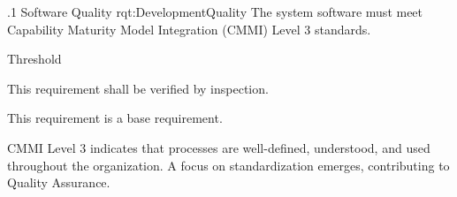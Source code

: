 \ONERQMT
{\RqtNumberBase.1}
{Software Quality}
{rqt:DevelopmentQuality}
{The system software must meet Capability Maturity Model Integration (CMMI) Level 3 standards.}
{
	\item [Phase 1] Threshold
}
{This requirement shall be verified by inspection.}
{
	\item [N/A] This requirement is a base requirement.
}
{
	\item CMMI Level 3 indicates that processes are well-defined, understood, and used throughout the organization. A focus on standardization emerges, contributing to Quality Assurance.
}
